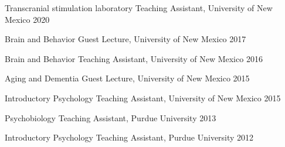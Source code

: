 
\begin{cvhonors}
  \cvhonor
    {Transcranial stimulation laboratory} %
    {Teaching Assistant, University of New Mexico} %
    {} %
    {2020} %
    
  \cvhonor
    {Brain and Behavior} %
    {Guest Lecture, University of New Mexico} %
    {} %
    {2017} %
    
  \cvhonor
    {Brain and Behavior} %
    {Teaching Assistant, University of New Mexico} %
    {} %
    {2016} %

  \cvhonor
    {Aging and Dementia} %
    {Guest Lecture, University of New Mexico} %
    {} %
    {2015} %
    
  \cvhonor
    {Introductory Psychology} %
    {Teaching Assistant, University of New Mexico} %
    {} %
    {2015} %
    
  \cvhonor
    {Psychobiology} %
    {Teaching Assistant, Purdue University} %
    {} %
    {2013} %

  \cvhonor
    {Introductory Psychology} %
    {Teaching Assistant, Purdue University} %
    {} %
    {2012} %
\end{cvhonors}    